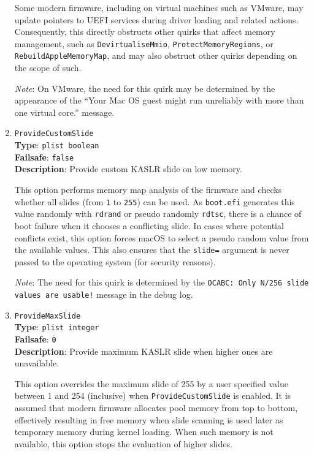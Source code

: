 \documentclass[]{article}
\begin{document}
\begin{enumerate}
  Some modern firmware, including on virtual machines such as VMware,
  may update pointers to UEFI services during driver loading and related actions.
  Consequently, this directly obstructs other quirks that affect memory management,
  such as \texttt{DevirtualiseMmio}, \texttt{ProtectMemoryRegions}, or \texttt{RebuildAppleMemoryMap},
  and may also obstruct other quirks depending on the scope of such.

  \emph{Note}: On VMware, the need for this quirk may be determined by the appearance of the
  ``Your Mac OS guest might run unreliably with more than one virtual core.'' message.

\item
  \texttt{ProvideCustomSlide}\\
  \textbf{Type}: \texttt{plist\ boolean}\\
  \textbf{Failsafe}: \texttt{false}\\
  \textbf{Description}: Provide custom KASLR slide on low memory.

  This option performs memory map analysis of the firmware and checks whether
  all slides (from \texttt{1} to \texttt{255}) can be used. As \texttt{boot.efi}
  generates this value randomly with \texttt{rdrand} or pseudo randomly \texttt{rdtsc},
  there is a chance of boot failure when it chooses a conflicting slide. In cases where
  potential conflicts exist, this option forces macOS to select a pseudo random value
  from the available values. This also ensures that the \texttt{slide=} argument is
  never passed to the operating system (for security reasons).

  \emph{Note}: The need for this quirk is determined by the \texttt{OCABC: Only N/256
  slide values are usable!} message in the debug log.

\item
  \texttt{ProvideMaxSlide}\\
  \textbf{Type}: \texttt{plist\ integer}\\
  \textbf{Failsafe}: \texttt{0}\\
  \textbf{Description}: Provide maximum KASLR slide when higher ones are unavailable.

  This option overrides the maximum slide of 255 by a user specified value between 1 and 254
  (inclusive) when \texttt{ProvideCustomSlide} is enabled. It is assumed that modern firmware
  allocates pool memory from top to bottom, effectively resulting in free memory when slide
  scanning is used later as temporary memory during kernel loading. When such memory is not
  available, this option stops the evaluation of higher slides.


\end{enumerate}
\end{document}

